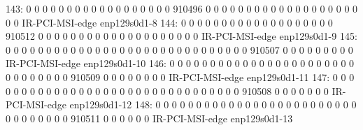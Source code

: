  143:          0          0          0          0          0          0          0          0          0          0          0          0          0          0          0          0          0          0     910496          0          0          0          0          0          0          0          0          0          0          0          0          0          0          0          0          0          0          0          0          0  IR-PCI-MSI-edge      enp129s0d1-8
 144:          0          0          0          0          0          0          0          0          0          0          0          0          0          0          0          0          0          0          0     910512          0          0          0          0          0          0          0          0          0          0          0          0          0          0          0          0          0          0          0          0  IR-PCI-MSI-edge      enp129s0d1-9
 145:          0          0          0          0          0          0          0          0          0          0          0          0          0          0          0          0          0          0          0          0          0          0          0          0          0          0          0          0          0          0     910507          0          0          0          0          0          0          0          0          0  IR-PCI-MSI-edge      enp129s0d1-10
 146:          0          0          0          0          0          0          0          0          0          0          0          0          0          0          0          0          0          0          0          0          0          0          0          0          0          0          0          0          0          0          0     910509          0          0          0          0          0          0          0          0  IR-PCI-MSI-edge      enp129s0d1-11
 147:          0          0          0          0          0          0          0          0          0          0          0          0          0          0          0          0          0          0          0          0          0          0          0          0          0          0          0          0          0          0          0          0     910508          0          0          0          0          0          0          0  IR-PCI-MSI-edge      enp129s0d1-12
 148:          0          0          0          0          0          0          0          0          0          0          0          0          0          0          0          0          0          0          0          0          0          0          0          0          0          0          0          0          0          0          0          0          0     910511          0          0          0          0          0          0  IR-PCI-MSI-edge      enp129s0d1-13
